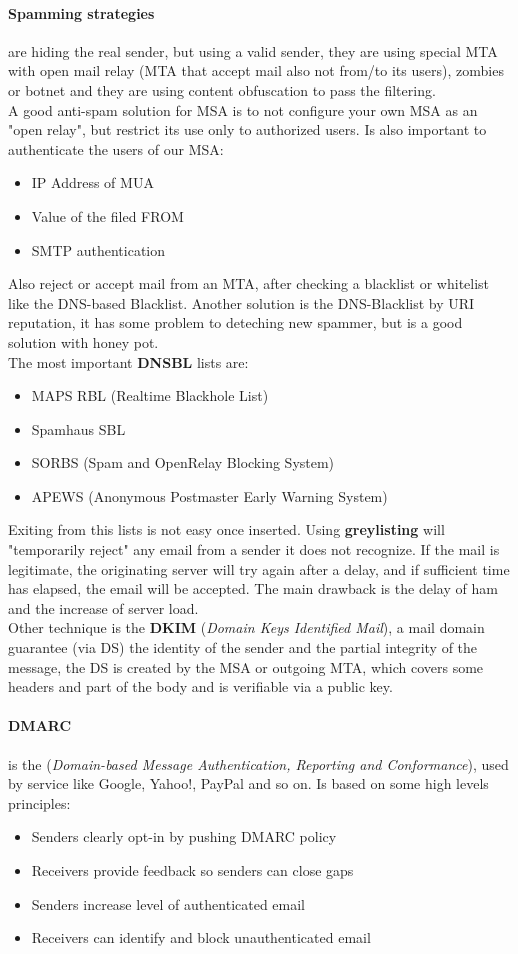\documentclass[12pt]{article}
\begin{document}
\paragraph{Spamming strategies} are hiding the real sender, but using a valid sender, they are using special MTA with open mail relay (MTA that accept mail also not from/to its users), zombies or botnet and they are using content obfuscation to pass the filtering.\\
A good anti-spam solution for MSA is to not configure your own MSA as an "open relay", but restrict its use only to authorized users. Is also important to authenticate the users of our MSA:
\begin{itemize}
  \item IP Address of MUA
  \item Value of the filed FROM
  \item SMTP authentication
\end{itemize}
Also reject or accept mail from an MTA, after checking a blacklist or whitelist like the DNS-based Blacklist. Another solution is the DNS-Blacklist by URI reputation, it has some problem to deteching new spammer, but is a good solution with honey pot.\\
The most important \textbf{DNSBL} lists are:
\begin{itemize}
  \item MAPS RBL (Realtime Blackhole List)
  \item Spamhaus SBL
  \item SORBS (Spam and OpenRelay Blocking System)
  \item APEWS (Anonymous Postmaster Early Warning System)
\end{itemize}
Exiting from this lists is not easy once inserted. Using \textbf{greylisting} will "temporarily reject" any email from a sender it does not recognize. If the mail is legitimate, the originating server will try again after a delay, and if sufficient time has elapsed, the email will be accepted. The main drawback is the delay of ham and the increase of server load.\\
Other technique is the \textbf{DKIM} (\textit{Domain Keys Identified Mail}), a mail domain guarantee (via DS) the identity of the sender and the partial integrity of the message, the DS is created by the MSA or outgoing MTA, which covers some headers and part of the body and is verifiable via a public key.

\paragraph{DMARC} is the (\textit{Domain-based Message Authentication, Reporting and Conformance}), used by service like Google, Yahoo!, PayPal and so on. Is based on some high levels principles:
\begin{itemize}
  \item Senders clearly opt-in by pushing DMARC policy
  \item Receivers provide feedback so senders can close gaps
  \item Senders increase level of authenticated email
  \item Receivers can identify and block unauthenticated email
\end{itemize}
\end{document}
